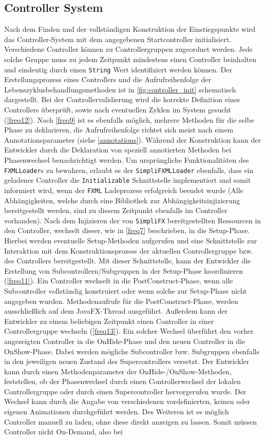 \subsection{Controller System}
Nach dem Finden und der vollständigen Konstruktion der Einstiegspunkte wird das Controller-System mit dem angegebenen Startcontroller initialisiert. Verschiedene Controller können zu Controllergruppen zugeordnet werden. Jede solche Gruppe muss zu jedem Zeitpunkt mindestens einen Controller beinhalten und eindeutig durch einen \texttt{String} Wert identifiziert werden können. Der Erstellungsprozess eines Controllers und die Aufrufreihenfolge der Lebenszyklusbehandlungsmethoden ist in \autoref{fig:controller_init} schematisch dargestellt. Bei der Controllervalidierung wird die korrekte Definition eines Controllers überprüft, sowie nach eventuellen Zyklen im System gesucht (\autoref{freq12}). Nach \autoref{freq9} ist es ebenfalls möglich, mehrere Methoden für die selbe Phase zu deklarieren, die Aufrufreihenfolge richtet sich meist nach einem Annotationsparameter (siehe \autoref{annotations}). Während der Konstruktion kann der Entwickler durch die Deklaration von speziell annotierten Methoden bei Phasenwechsel benachrichtigt werden. Um ursprüngliche Funktionalitäten des \texttt{FXMLLoader}s zu bewahren, erlaubt es der \texttt{SimpliFXMLLoader} ebenfalls, dass ein geladener Controller die \texttt{Initializable} Schnittstelle implementiert und somit informiert wird, wenn der \texttt{FXML} Ladeprozess erfolgreich beendet wurde (Alle Abhängigkeiten, welche durch eine Bibliothek zur Abhängigkeitsinjizierung bereitgestellt werden, sind zu diesem Zeitpunkt ebenfalls im Controller vorhanden). Nach dem Injizieren der von \texttt{SimpliFX} bereitgestellten Ressourcen in den Controller, wechselt dieser, wie in \autoref{freq7} beschrieben, in die Setup-Phase. Hierbei werden eventuelle Setup-Methoden aufgerufen und eine Schnittstelle zur Interaktion mit dem Konstruktionsprozess der aktuellen Controllergruppe bzw. des Controllers bereitgestellt. Mit dieser Schnittstelle, kann der Entwickler die Erstellung von Subcontrollern/Subgruppen in der Setup-Phase koordinieren (\autoref{freq11}). Ein Controller wechselt in die PostConstruct-Phase, wenn alle Subcontroller vollständig konstruiert oder wenn solche zur Setup-Phase nicht angegeben wurden. Methodenaufrufe für die PostConstruct-Phase, werden ausschließlich auf dem JavaFX-Thread ausgeführt. Außerdem kann der Entwickler zu einem beliebigen Zeitpunkt einen Controller in einer Controllergruppe wechseln (\autoref{freq13}). Ein solcher Wechsel überführt den vorher angezeigten Controller in die OnHide-Phase und den neuen Controller in die OnShow-Phase. Dabei werden mögliche Subcontroller bzw. Subgruppen ebenfalls in den jeweiligen neuen Zustand des Supercontrollers versetzt. Der Entwickler kann durch einen Methodenparameter der OnHide-/OnShow-Methoden, feststellen, ob der Phasenwechsel durch einen Controllerwechsel der lokalen Controllergruppe oder durch einen Supercontroller hervorgerufen wurde. Der Wechsel kann durch die Angabe von verschiedenen vordefinierten, keinen oder eigenen Animationen durchgeführt werden. Des Weiteren ist es möglich Controller manuell zu laden, ohne diese direkt anzeigen zu lassen. Somit müssen Controller nicht On-Demand, also bei 